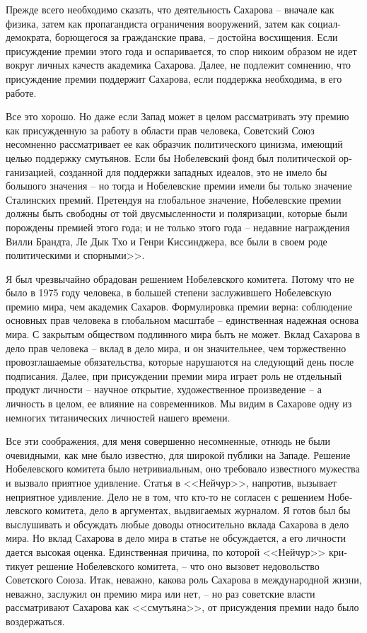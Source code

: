 \documentclass{book}
\begin{document}
Прежде всего необходимо сказать, что деятельность Сахарова -- вначале как физика, затем как пропагандиста ограничения вооружений, затем как социал-демократа, борющегося за гражданские права, -- достойна восхищения. Ес­ли присуждение премии этого года и оспаривается, то спор ни­коим образом не идет вокруг личных качеств академика Са­харова. Далее, не подлежит сомнению, что присуждение пре­мии поддержит Сахарова, если поддержка необходима, в его работе.

Все это хорошо. Но даже если Запад может в целом рассмат­ривать эту премию как присужденную за работу в области прав человека, Советский Союз несомненно рассматривает ее как образчик политического цинизма, имеющий целью поддержку смутьянов. Если бы Нобелевский фонд был политической ор­ганизацией, созданной для поддержки западных идеалов, это не имело бы большого значения -- но тогда и Нобелевские премии имели бы только значение Сталинских премий. Пре­тендуя на глобальное значение, Нобелевские премии должны быть свободны от той двусмысленности и поляризации, кото­рые были порождены премией этого года; и не только этого года -- недавние награждения Вилли Брандта, Ле Дык Тхо и Генри Киссинджера, все были в своем роде политическими и спорными>>.%

Я был чрезвычайно обрадован решением Нобелевского комитета. Потому что не было в 1975 году человека, в большей степени заслужившего Нобелевскую премию мира, чем акаде­мик Сахаров. Формулировка премии верна: соблюдение основ­ных прав человека в глобальном масштабе -- единственная на­дежная основа мира. С закрытым обществом подлинного мира быть не может. Вклад Сахарова в дело прав человека -- вклад в дело мира, и он значительнее, чем торжественно провозгла­шаемые обязательства, которые нарушаются на следующий день после подписания. Далее, при присуждении премии мира играет роль не отдельный продукт личности -- научное открытие, художественное произведение -- а личность в целом, ее влияние на современников. Мы видим в Сахарове одну из немногих титанических личностей нашего времени.

Все эти соображения, для меня совершенно несомненные, отнюдь не были очевидными, как мне было известно, для широ­кой публики на Западе. Решение Нобелевского комитета было нетривиальным, оно требовало известного мужества и вызвало приятное удивление.
Статья в <<Нейчур>>, напротив, вызывает неприятное удив­ление. Дело не в том, что кто-то не согласен с решением Нобе­левского комитета, дело в аргументах, выдвигаемых журналом. Я готов был бы выслушивать и обсуждать любые доводы отно­сительно вклада Сахарова в дело мира. Но вклад Сахарова в дело мира в статье не обсуждается, а его личности дается высо­кая оценка. Единственная причина, по которой <<Нейчур>> кри­тикует решение Нобелевского комитета, -- что оно вызовет недовольство Советского Союза. Итак, неважно, какова роль Сахарова в международной жизни, неважно, заслужил он пре­мию мира или нет, -- но раз советские власти рассматривают Сахарова как <<смутьяна>>, от присуждения премии надо было воздержаться.
\end{document}
